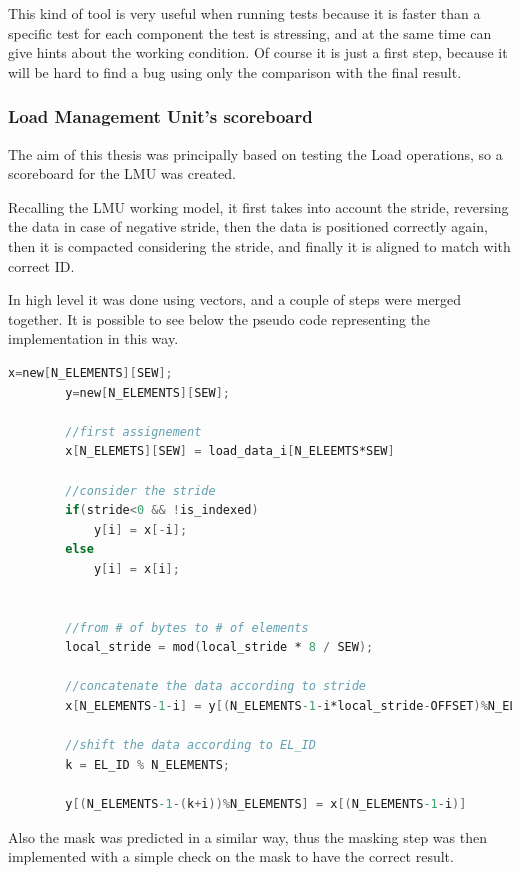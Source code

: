 This kind of tool is very useful when running tests because it is faster than a specific test for each component the test is stressing, and at the same time can give hints about the working condition. Of course it is just a first step, because it will be hard to find a bug using only the comparison with the final result.

\subsubsection{Load Management Unit's scoreboard}
The aim of this thesis was principally based on testing the Load operations, so a scoreboard for the LMU was created.

Recalling the LMU working model, it first takes into account the stride, reversing the data in case of negative stride, then the data is positioned correctly again, then it is compacted considering the stride, and finally it is aligned to match with correct ID.

In high level it was done using vectors, and a couple of steps were merged together. It is possible to see below the pseudo code representing the implementation in this way.

\linespread{1}
\begin{lstlisting}[language=Verilog,style=verilog-style, backgroundcolor=\color{lyel_palette}, frame=tlb]
        x=new[N_ELEMENTS][SEW];
        y=new[N_ELEMENTS][SEW];

        //first assignement
        x[N_ELEMETS][SEW] = load_data_i[N_ELEEMTS*SEW]

        //consider the stride
        if(stride<0 && !is_indexed)
            y[i] = x[-i];
        else
            y[i] = x[i];
        

        //from # of bytes to # of elements
        local_stride = mod(local_stride * 8 / SEW);

        //concatenate the data according to stride 
        x[N_ELEMENTS-1-i] = y[(N_ELEMENTS-1-i*local_stride-OFFSET)%N_ELEMENTS];

        //shift the data according to EL_ID
        k = EL_ID % N_ELEMENTS;
        
        y[(N_ELEMENTS-1-(k+i))%N_ELEMENTS] = x[(N_ELEMENTS-1-i)]
\end{lstlisting}
\linespread{1.2}

Also the mask was predicted in a similar way, thus the masking step was then implemented with a simple check on the mask to have the correct result.

